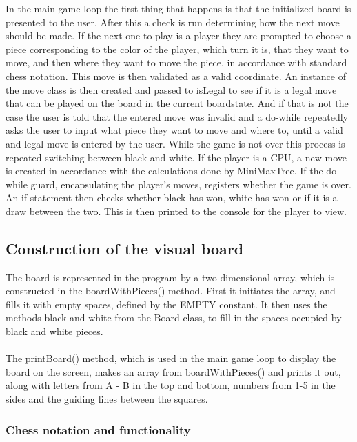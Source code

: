 \documentclass[12pt, a4paper]{article}
\begin{document}
	In the main game loop the first thing that happens is that the initialized board is presented to the user. After this a check is run determining how the next move should be made. If the next one to play is a player they are prompted to choose a piece corresponding to the color of the player, which turn it is, that they want to move, and then where they want to move the piece, in accordance with standard chess notation. This move is then validated as a valid coordinate. An instance of the move class is then created and passed to isLegal to see if it is a legal move that can be played on the board in the current boardstate. And if that is not the case the user is told that the entered move was invalid and a do-while repeatedly asks the user to input what piece they want to move and where to, until a valid and legal move is entered by the user. While the game is not over this process is repeated switching between black and white. If the player is a CPU, a new move is created in accordance with the calculations done by MiniMaxTree. If the do-while guard, encapsulating the player's moves, registers whether the game is over. An if-statement then checks whether black has won, white has won or if it is a draw between the two. This is then printed to the console for the player to view.
	
	\subsection{Construction of the visual board}
	
	The board is represented in the program by a two-dimensional array, which is constructed in the boardWithPieces() method.
	First it initiates the array, and fills it with empty spaces, defined by the EMPTY constant.
	It then uses the methods black and white from the Board class, to fill in the spaces occupied by black and white pieces.
	\\\\
	
	The printBoard() method, which is used in the main game loop to display the board on the screen, makes an array from boardWithPieces() and prints it out, along with letters from A - B in the top and bottom, numbers from 1-5 in the sides and the guiding lines between the squares.
	
	\subsubsection{Chess notation and functionality}
	
\end{document}
